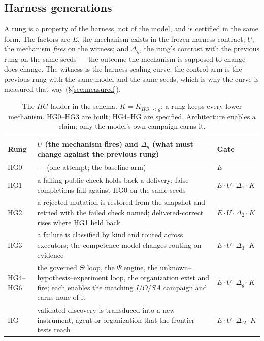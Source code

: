 \subsection{Harness generations}
A rung is a property of the harness, not of the model, and is certified in the same form. The factors are $E$, the mechanism exists in the frozen harness contract; $U$, the mechanism \emph{fires} on the witness; and $\Delta_g$, the rung's contrast with the previous rung on the same seeds --- the outcome the mechanism is supposed to change does change. The witness is the harness-scaling curve; the control arm is the previous rung with the same model and the same seeds, which is why the curve is measured that way (\S\ref{sec:measured}).
\begin{table}[!htbp]
\centering\small
\begin{tabularx}{\textwidth}{@{}lYl@{}}
\toprule
Rung & $U$ (the mechanism fires) and $\Delta_g$ (what must change against the previous rung) & Gate \\
\midrule
HG0 & --- (one attempt; the baseline arm) & $E$ \\
HG1 & a failing public check holds back a delivery; false completions fall against HG0 on the same seeds & $E\cdot U\cdot\Delta_1\cdot K$ \\
HG2 & a rejected mutation is restored from the snapshot and retried with the failed check named; delivered-correct rises where HG1 held back & $E\cdot U\cdot\Delta_2\cdot K$ \\
HG3 & a failure is classified by kind and routed across executors; the competence model changes routing on evidence & $E\cdot U\cdot\Delta_3\cdot K$ \\
HG4--HG6 & the governed $\Theta$ loop, the $\Psi$ engine, the unknown--hypothesis--experiment loop, the organization exist and fire; each enables the matching $I$/$O$/$SA$ campaign and earns none of it & $E\cdot U\cdot\Delta_g\cdot K$ \\
HG\Om{} & validated discovery is transduced into a new instrument, agent or organization that the frontier tests reach & $E\cdot U\cdot\Delta_\Omega\cdot K$ \\
\bottomrule
\end{tabularx}
\caption{The $HG$ ladder in the schema. $K = K_{HG,<g}$: a rung keeps every lower mechanism. HG0--HG3 are built; HG4--HG\Om{} are specified. Architecture enables a claim; only the model's own campaign earns it.}
\label{tab:hgstyle}
\end{table}

